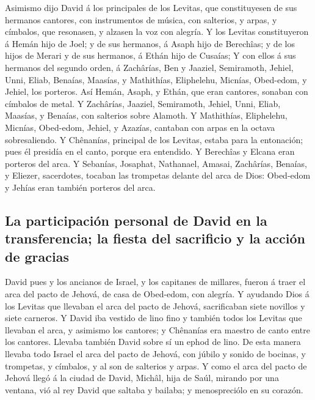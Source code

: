  Asimismo dijo David á los principales de los Levitas,
que constituyesen de sus hermanos cantores, con instrumentos de música,
con salterios, y arpas, y címbalos, que resonasen, y alzasen la voz con
alegría.  Y los Levitas constituyeron á Hemán hijo de
Joel; y de sus hermanos, á Asaph hijo de Berechîas; y de los hijos de
Merari y de sus hermanos, á Ethán hijo de Cusaías;  Y con
ellos á sus hermanos del segundo orden, á Zachârías, Ben y Jaaziel,
Semiramoth, Jehiel, Unni, Eliab, Benaías, Maasías, y Mathithías,
Eliphelehu, Micnías, Obed-edom, y Jehiel, los porteros. 
Así Hemán, Asaph, y Ethán, que eran cantores, sonaban con címbalos de
metal.  Y Zachârías, Jaaziel, Semiramoth, Jehiel, Unni,
Eliab, Maasías, y Benaías, con salterios sobre Alamoth. 
Y Mathithías, Eliphelehu, Micnías, Obed-edom, Jehiel, y Azazías,
cantaban con arpas en la octava sobresaliendo.  Y
Chênanías, principal de los Levitas, estaba para la entonación; pues él
presidía en el canto, porque era entendido.  Y Berechîas
y Elcana eran porteros del arca.  Y Sebanías, Josaphat,
Nathanael, Amasai, Zachârías, Benaías, y Eliezer, sacerdotes, tocaban
las trompetas delante del arca de Dios: Obed-edom y Jehías eran también
porteros del arca.

\hypertarget{la-participaciuxf3n-personal-de-david-en-la-transferencia-la-fiesta-del-sacrificio-y-la-acciuxf3n-de-gracias}{%
\subsection{La participación personal de David en la transferencia; la
fiesta del sacrificio y la acción de
gracias}\label{la-participaciuxf3n-personal-de-david-en-la-transferencia-la-fiesta-del-sacrificio-y-la-acciuxf3n-de-gracias}}

 David pues y los ancianos de Israel, y los capitanes de
millares, fueron á traer el arca del pacto de Jehová, de casa de
Obed-edom, con alegría.  Y ayudando Dios á los Levitas
que llevaban el arca del pacto de Jehová, sacrificaban siete novillos y
siete carneros.  Y David iba vestido de lino fino y
también todos los Levitas que llevaban el arca, y asimismo los cantores;
y Chênanías era maestro de canto entre los cantores. Llevaba también
David sobre sí un ephod de lino.  De esta manera llevaba
todo Israel el arca del pacto de Jehová, con júbilo y sonido de bocinas,
y trompetas, y címbalos, y al son de salterios y arpas. 
Y como el arca del pacto de Jehová llegó á la ciudad de David, Michâl,
hija de Saúl, mirando por una ventana, vió al rey David que saltaba y
bailaba; y menospreciólo en su corazón.

